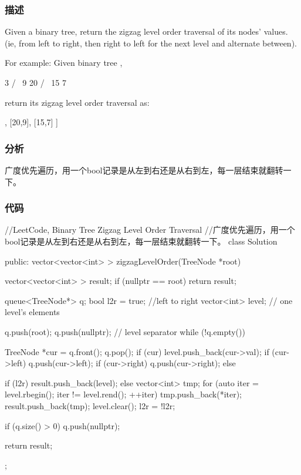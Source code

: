\subsubsection{描述}
Given a binary tree, return the zigzag level order traversal of its nodes' values. (ie, from left to right, then right to left for the next level and alternate between).

For example:
Given binary tree ,
\begin{Code}
    3
   / \
  9  20
    /  \
   15   7
\end{Code}
return its zigzag level order traversal as:
\begin{Code}
[
  [3],
  [20,9],
  [15,7]
]
\end{Code}


\subsubsection{分析}
广度优先遍历，用一个bool记录是从左到右还是从右到左，每一层结束就翻转一下。


\subsubsection{代码}
\begin{Code}
//LeetCode, Binary Tree Zigzag Level Order Traversal
//广度优先遍历，用一个bool记录是从左到右还是从右到左，每一层结束就翻转一下。
class Solution {
public:
    vector<vector<int> > zigzagLevelOrder(TreeNode *root) {
        vector<vector<int> > result;
        if (nullptr == root) return result;

        queue<TreeNode*> q;
        bool l2r = true;  //left to right
        vector<int> level;  // one level's elements

        q.push(root);
        q.push(nullptr);  // level separator
        while (!q.empty()) {
            TreeNode *cur = q.front();
            q.pop();
            if (cur) {
                level.push_back(cur->val);
                if (cur->left) q.push(cur->left);
                if (cur->right) q.push(cur->right);
            } else {
                if (l2r) {
                    result.push_back(level);
                } else {
                    vector<int> tmp;
                    for (auto iter = level.rbegin(); iter != level.rend(); ++iter) {
                        tmp.push_back(*iter);
                    }
                    result.push_back(tmp);
                }
                level.clear();
                l2r = !l2r;

                if (q.size() > 0) q.push(nullptr);
            }
        }

        return result;
    }
};
\end{Code}


